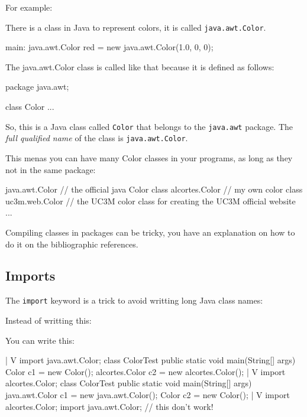 \documentclass[a4paper, 9pt]{extarticle}
\begin{document}
For example:

There is a class in Java to represent colors, it is called
\texttt{java.awt.Color}.

\begin{blackboard}
  main:
    java.awt.Color red = new java.awt.Color(1.0, 0, 0);
\end{blackboard}

The java.awt.Color class is called like that because it is defined as follows:

\begin{blackboard}
package java.awt;

class Color {
...
}
\end{blackboard}

So, this is a Java class called \texttt{Color} that belongs to the
\texttt{java.awt} package. The \textsl{full qualified name} of the class is
\texttt{java.awt.Color}.

This menas you can have many Color classes in your programs, as long as they
not in the same package:

\begin{blackboard}
java.awt.Color // the official java Color class
alcortes.Color // my own color class
uc3m.web.Color // the UC3M color class for creating the UC3M official website
...
\end{blackboard}

Compiling classes in packages can be tricky, you have an explanation on how to
do it on the bibliographic references.





\subsection{Imports}

The \texttt{import} keyword is a trick to avoid writting long Java class names:

Instead of writting this:


You can write this:

\begin{blackboard}
              |
              V
import java.awt.Color;
class ColorTest {
    public static void main(String[] args) {
        Color c1 = new Color();
        alcortes.Color c2 = new alcortes.Color();
    }
}
              |
              V
import alcortes.Color;
class ColorTest {
    public static void main(String[] args) {
        java.awt.Color c1 = new java.awt.Color();
        Color c2 = new Color();
    }
}
              |
              V
import alcortes.Color;
import java.awt.Color;
// this don't work!
\end{blackboard}
\end{document}
